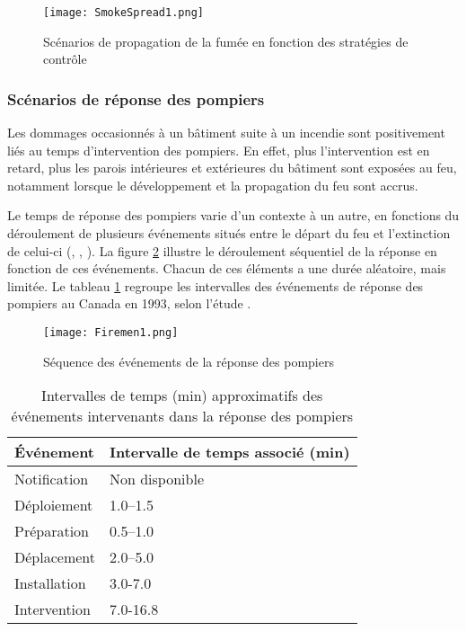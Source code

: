 \documentclass[11pt]{article}
\begin{document}
\begin{figure}
\begin{center}

\texttt{[image: SmokeSpread1.png]}
\end{center}
\caption{Scénarios de propagation de la fumée en fonction des stratégies de contrôle}\label{SmokeSpread1}
\end{figure}

\subsubsection{Scénarios de réponse des pompiers}

Les dommages occasionnés à un bâtiment suite à un incendie sont positivement liés au temps d'intervention des pompiers. En effet, plus l'intervention est en retard, plus les parois intérieures et extérieures du bâtiment sont exposées au feu, notamment lorsque le développement et la propagation du feu sont accrus.

Le temps de réponse des pompiers varie d'un contexte à un autre, en fonctions du déroulement de plusieurs événements situés entre le départ du feu et l'extinction de celui-ci (\cite{gaskin1993canadian}, \cite{benichou1999impact}, \cite{us2006structure}). La figure \ref{Firemen1} illustre le déroulement séquentiel de la réponse en fonction de ces événements. Chacun de ces éléments a une durée aléatoire, mais limitée. Le tableau \ref{Tempspomp} regroupe les intervalles des événements de réponse des pompiers au Canada en 1993, selon l'étude \cite{gaskin1993canadian}.

\begin{figure}
\begin{center}
\texttt{[image: Firemen1.png]}
\end{center}
\caption{Séquence des événements de la réponse des pompiers}
\label{Firemen1}
\end{figure}

\begin{table}
\begin{center}
\begin{tabular}{|p{5cm}|m{7cm}|}
\hline
\textbf{Événement} & \textbf{Intervalle de temps associé (min)}\\
\hline
Notification & Non disponible\\
\hline
Déploiement &  1.0–1.5\\
\hline
Préparation & 0.5–1.0\\
\hline
Déplacement & 2.0–5.0\\
\hline
Installation & 3.0-7.0\\
\hline
Intervention & 7.0-16.8\\
\hline
\end{tabular}

\caption{Intervalles de temps (min) approximatifs des événements intervenants dans la réponse des pompiers}
\label{Tempspomp}
\end{center}
\end{table}
\end{document}
